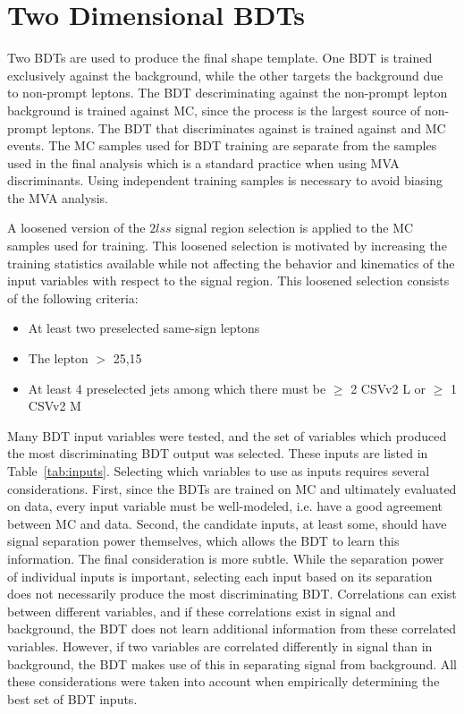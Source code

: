 \section{Two Dimensional BDTs}
\label{sec:2D_BDT}
Two BDTs are used to produce the final shape template. One BDT is trained exclusively against the \ttv background, while the other targets the background due to non-prompt
leptons. The BDT descriminating against the non-prompt lepton background is trained against \ttbar MC, since the \ttbar process is the largest source of non-prompt leptons.
The BDT that discriminates against \ttv is trained against \ttw and \ttz MC events. The MC samples used for BDT training are separate from the samples used in the final
analysis which is a standard practice when using MVA discriminants. Using independent training samples is necessary to avoid biasing the MVA analysis. 

A loosened version of the $2lss$ signal region selection is applied to the MC samples used for training. This loosened selection is motivated by increasing the training statistics available
while not affecting the behavior and kinematics of the input variables with respect to the signal region. This loosened selection consists of the following criteria:
\begin{itemize}
\item At least two preselected same-sign leptons
\item The lepton \pt $>$ 25,15 
\item At least 4 preselected jets among which there must be $\geq$ 2 CSVv2 L or $\geq$ 1 CSVv2 M
\end{itemize}

Many BDT input variables were tested, and the set of variables which produced the most discriminating BDT output was selected. These inputs are listed in Table~\ref{tab:inputs}.
Selecting which variables to use as inputs requires several considerations. First, since the BDTs are trained on MC and ultimately evaluated on data, every
input variable must be well-modeled, i.e. have a good agreement between MC and data. Second, the candidate inputs, at least some, should have signal separation power themselves,
which allows the BDT to learn this information. The final consideration is more subtle. While the separation power of individual inputs is important, selecting each input
based on its separation does not necessarily produce the most discriminating BDT. Correlations can exist between different variables, and if these correlations exist in
signal and background, the BDT does not learn additional information from these correlated variables. However, if two variables are correlated differently in signal
than in background, the BDT makes use of this in separating signal from background. All these considerations were taken into account when empirically determining the best
set of BDT inputs.

